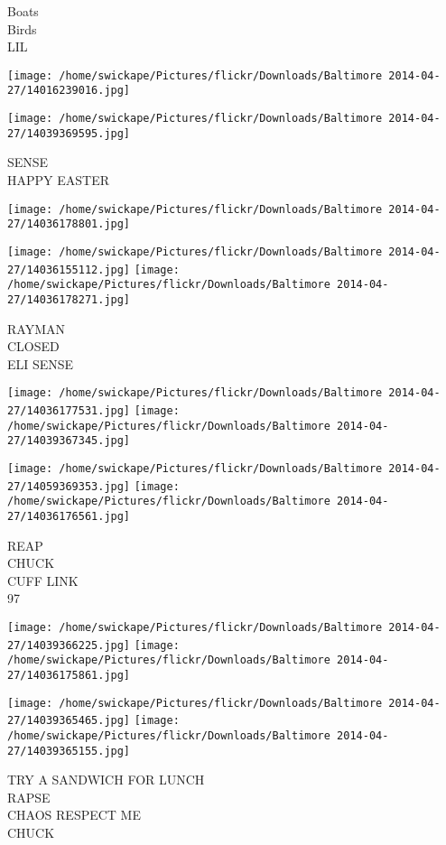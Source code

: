 \documentclass[10pt,letterpaper]{article}
\begin{document}
Boats\\
Birds\\
LIL
\pagebreak

\texttt{[image: /home/swickape/Pictures/flickr/Downloads/Baltimore 2014-04-27/14016239016.jpg]}

\vspace{0.25in}
\texttt{[image: /home/swickape/Pictures/flickr/Downloads/Baltimore 2014-04-27/14039369595.jpg]}

SENSE\\
HAPPY EASTER
\pagebreak

\texttt{[image: /home/swickape/Pictures/flickr/Downloads/Baltimore 2014-04-27/14036178801.jpg]}

\vspace{0.25in}
\texttt{[image: /home/swickape/Pictures/flickr/Downloads/Baltimore 2014-04-27/14036155112.jpg]}
\texttt{[image: /home/swickape/Pictures/flickr/Downloads/Baltimore 2014-04-27/14036178271.jpg]}

RAYMAN\\
CLOSED\\
ELI SENSE
\pagebreak

\texttt{[image: /home/swickape/Pictures/flickr/Downloads/Baltimore 2014-04-27/14036177531.jpg]}
\texttt{[image: /home/swickape/Pictures/flickr/Downloads/Baltimore 2014-04-27/14039367345.jpg]}

\texttt{[image: /home/swickape/Pictures/flickr/Downloads/Baltimore 2014-04-27/14059369353.jpg]}
\texttt{[image: /home/swickape/Pictures/flickr/Downloads/Baltimore 2014-04-27/14036176561.jpg]}

REAP\\
CHUCK\\
CUFF LINK\\
97
\pagebreak

\texttt{[image: /home/swickape/Pictures/flickr/Downloads/Baltimore 2014-04-27/14039366225.jpg]}
\texttt{[image: /home/swickape/Pictures/flickr/Downloads/Baltimore 2014-04-27/14036175861.jpg]}

\texttt{[image: /home/swickape/Pictures/flickr/Downloads/Baltimore 2014-04-27/14039365465.jpg]}
\texttt{[image: /home/swickape/Pictures/flickr/Downloads/Baltimore 2014-04-27/14039365155.jpg]}

TRY A SANDWICH FOR LUNCH\\
RAPSE\\
CHAOS RESPECT ME\\
CHUCK
\pagebreak
\end{document}

